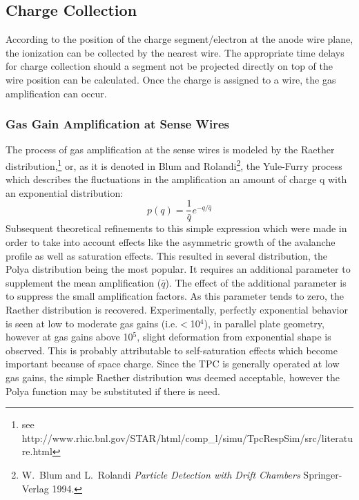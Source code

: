 \documentclass{article}
\begin{document}
\subsection{Charge Collection}

According to the position of the charge segment/electron at the
anode wire plane, the ionization can be collected by the nearest wire.
The appropriate time delays for charge collection should a segment not
be projected directly on top of the wire position can be calculated.
Once the charge is assigned to a wire, the gas amplification can occur.

\subsubsection{Gas Gain Amplification at Sense Wires}

The process of gas amplification at the sense wires is modeled
by the Raether distribution,\footnote{see http://www.rhic.bnl.gov/STAR/html/comp\_l/simu/TpcRespSim/src/literature.html}
or, as it is denoted in Blum and Rolandi\footnote{W.~Blum and L.~Rolandi
  {\em Particle Detection with Drift Chambers} Springer-Verlag 1994.},
the Yule-Furry process which
describes the fluctuations in the amplification an amount of
charge q with an exponential distribution:
\begin{equation}
          p(q) = \frac{1}{\bar{q}} e^{-q/\bar{q}}
\label{eq:raether}
\end{equation}
Subsequent theoretical refinements to this simple expression which
were made in order to take into account effects like
the asymmetric growth of the avalanche profile as well as saturation
effects.  This resulted in several distribution, the Polya distribution
being the most popular.  It requires an additional parameter to supplement
the mean amplification ($\bar{q}$).  The effect of the additional parameter
is to suppress the small amplification factors.
As this parameter tends to zero, the Raether distribution is recovered.
Experimentally, perfectly exponential behavior is seen at
low to moderate gas gains (i.e.$<$10$^{4}$), in parallel plate geometry,
however at gas gains above 10$^{5}$, slight deformation from
exponential shape is observed.  This is probably
attributable to self-saturation effects which
become important because of space charge.  Since the TPC is generally
operated at low gas gains, the simple Raether distribution was
deemed acceptable, however the Polya function may be substituted
if there is need.
\end{document}
